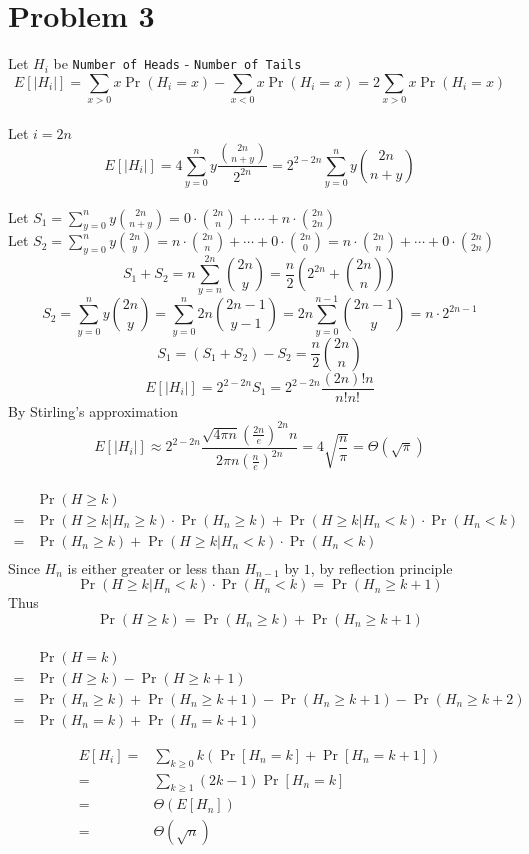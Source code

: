 \documentclass[12pt]{article}
\begin{document}
\section*{Problem 3}
Let $H_i$ be \texttt{Number of Heads} - \texttt{Number of Tails}\\
$$E[|H_i|]=\sum_{x>0}x\Pr(H_i=x)-\sum_{x<0}x\Pr(H_i=x)=2\sum_{x>0}x\Pr(H_i=x)$$\\
Let $i=2n$\\
$$E[|H_i|]=4\sum_{y=0}^n y\dfrac{\binom{2n}{n+y}}{2^{2n}}=2^{2-2n}\sum_{y=0}^n y\binom{2n}{n+y}$$\\
Let $S_1=\sum_{y=0}^n y\binom{2n}{n+y}=0\cdot\binom{2n}{n}+\cdots+n\cdot\binom{2n}{2n}$\\
Let $S_2=\sum_{y=0}^{n} y\binom{2n}{y}=n\cdot\binom{2n}{n}+\cdots+0\cdot\binom{2n}{0}=n\cdot\binom{2n}{n}+\cdots+0\cdot\binom{2n}{2n}$\\
$$S_1+S_2=n\sum_{y=n}^{2n}\binom{2n}{y}=\frac{n}{2}\left(2^{2n}+\binom{2n}{n}\right)$$
$$S_2=\sum_{y=0}^{n} y\binom{2n}{y}=\sum_{y=0}^n 2n\binom{2n-1}{y-1}=2n\sum_{y=0}^{n-1} \binom{2n-1}{y}=n\cdot2^{2n-1}$$
$$S_1=(S_1+S_2)-S_2=\frac{n}{2}\binom{2n}{n}$$
$$E[|H_i|]=2^{2-2n}S_1=2^{2-2n}\frac{(2n)!n}{n!n!}$$
By Stirling's approximation
$$E[|H_i|]\approx2^{2-2n}\frac{\sqrt{4\pi n}\left(\frac{2n}{e}\right)^{2n}n}{2\pi n\left(\frac{n}{e}\right)^{2n}}=4\sqrt{\frac{n}{\pi}}=\Theta(\sqrt{\pi})$$\\
\begin{align*}
&\Pr(H\geq k)\\
=&\Pr(H\geq k|H_n\geq k)\cdot\Pr(H_n\geq k)+\Pr(H\geq k|H_n<k)\cdot\Pr(H_n<k)\\
=&\Pr(H_n\geq k)+\Pr(H\geq k|H_n<k)\cdot\Pr(H_n<k)\\
\end{align*}
Since $H_n$ is either greater or less than $H_{n-1}$ by $1$, by reflection principle\\
$$\Pr(H\geq k|H_n<k)\cdot\Pr(H_n<k)=\Pr(H_n\geq k+1)$$
Thus
$$\Pr(H\geq k)=\Pr(H_n\geq k)+\Pr(H_n\geq k+1)$$\\

\begin{align*}
&\Pr(H=k)\\
=&\Pr(H\geq k)-\Pr(H\geq k+1)\\
=&\Pr(H_n\geq k)+\Pr(H_n\geq k+1)-\Pr(H_n\geq k+1)-\Pr(H_n\geq k+2)\\
=&\Pr(H_n=k)+\Pr(H_n=k+1)
\end{align*}

\begin{align*}
E[H_i] =& \sum_{k \geq 0} k(\Pr[H_n = k] + \Pr[H_n = k+1]) \\
=& \sum_{k \geq 1} (2k-1) \Pr[H_n = k] \\ 
=& \Theta(E[H_n])\\
=& \Theta(\sqrt{n})
\end{align*}
\end{document}
